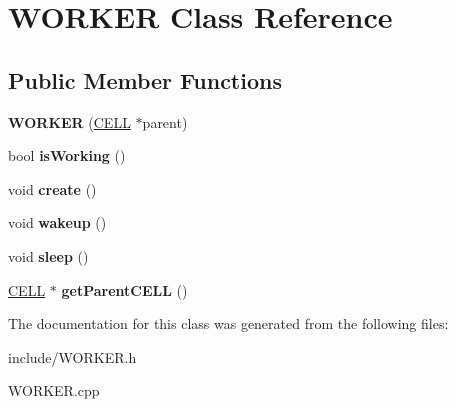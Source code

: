 \hypertarget{classWORKER}{}\section{W\+O\+R\+K\+E\+R Class Reference}
\label{classWORKER}
\subsection*{Public Member Functions}
\begin{DoxyCompactItemize}
\item 
\hypertarget{classWORKER_ae9ea2fc90f6cb11e7112f6b66b90f834}{}{\bfseries W\+O\+R\+K\+E\+R} (\hyperlink{classCELL}{C\+E\+L\+L} $\ast$parent)\label{classWORKER_ae9ea2fc90f6cb11e7112f6b66b90f834}

\item 
\hypertarget{classWORKER_ab7846a18291a8256d8834d5ce2cd2264}{}bool {\bfseries is\+Working} ()\label{classWORKER_ab7846a18291a8256d8834d5ce2cd2264}

\item 
\hypertarget{classWORKER_ac67e81ebc21a012b2ee0b486207b7b66}{}void {\bfseries create} ()\label{classWORKER_ac67e81ebc21a012b2ee0b486207b7b66}

\item 
\hypertarget{classWORKER_a4096ee44fb20e1d02708b04ee1536f0f}{}void {\bfseries wakeup} ()\label{classWORKER_a4096ee44fb20e1d02708b04ee1536f0f}

\item 
\hypertarget{classWORKER_a6aed2eee5acd22c3188305ae7e31b8d7}{}void {\bfseries sleep} ()\label{classWORKER_a6aed2eee5acd22c3188305ae7e31b8d7}

\item 
\hypertarget{classWORKER_a2153365418c1449448bd7ed0024540b8}{}\hyperlink{classCELL}{C\+E\+L\+L} $\ast$ {\bfseries get\+Parent\+C\+E\+L\+L} ()\label{classWORKER_a2153365418c1449448bd7ed0024540b8}

\end{DoxyCompactItemize}


The documentation for this class was generated from the following files\+:\begin{DoxyCompactItemize}
\item 
include/W\+O\+R\+K\+E\+R.\+h\item 
W\+O\+R\+K\+E\+R.\+cpp\end{DoxyCompactItemize}
